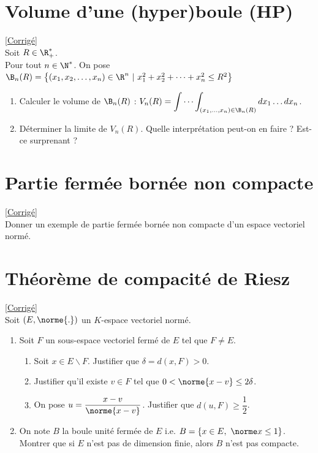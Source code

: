 \documentclass{book}
\begin{document}
\section{Volume d'une (hyper)boule  (HP)}
\label{Volume d'une (hyper)boule}
\textcolor{blue}{\hyperref[sec:volume-dune-hyperboule-etoile3]{[Corrigé]}}\\
Soit $R\in\R^*_+$.
\\Pour tout $n\in\N^*$. On pose $\B_n(R)=\left\{(x_1,x_2,\dots,x_n)\in \R^n \ | \ x_1^2+x_2^2+\dots+x_n^2\leq R^2\right\}$
\begin{enumerate}
	\item Calculer le volume de $\B_n(R)$ : $V_n(R)=\displaystyle\idotsint_{(x_1,\dots,x_n)\in \B_n(R)}dx_1\dots dx_n$.
	\item Déterminer la limite de $V_n(R)$. Quelle interprétation peut-on en faire ? Est-ce surprenant ?
\end{enumerate}

\section{Partie fermée bornée non compacte }
\label{Partie fermée bornée non compacte}
\textcolor{blue}{\hyperref[sec:partie-fermee-bornee-non-compacte-etoile3]{[Corrigé]}}\\
Donner un exemple de partie fermée bornée non compacte d'un espace vectoriel normé.

\section{Théorème de compacité de Riesz }
\label{Théorème de compacité de Riesz}
\textcolor{blue}{\hyperref[sec:theoreme-de-compacite-de-riesz-etoile4]{[Corrigé]}}\\
Soit $(E,\norme{.})$ un $K$-espace vectoriel normé.
\begin{enumerate}
	\item Soit $F$ un sous-espace vectoriel fermé de $E$ tel que $F\ne E$.
	\begin{enumerate}[label=\alph*.]
		\item Soit $x\in E\backslash F$. Justifier que $\delta=d(x,F)>0$.
		\item Justifier qu'il existe $v\in F$ tel que $0<\norme{x-v}\leq 2\delta$.
		\item On pose $u=\dfrac{x-v}{\norme{x-v}}$. Justifier que $d(u,F)\geq \dfrac{1}{2}$.
	\end{enumerate}
	\item On note $B$ la boule unité fermée de $E$ i.e. $B=\{x\in E,\ \norme x\leq 1\}$. Montrer que si $E$ n'est pas de dimension finie, alors $B$ n'est pas compacte.
\end{enumerate}
\end{document}
